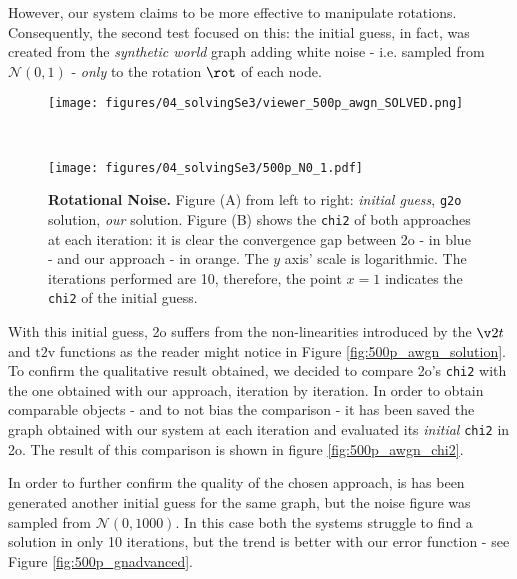 However, our system claims to be more effective to manipulate rotations. Consequently, the second test focused on this: the initial guess, in fact, was created from the \textit{synthetic world} graph adding white noise - i.e. sampled from $\mathcal{N}(0,1)$ - \textit{only} to the rotation $\rot$ of each node.

\begin{figure}[!hbt]
    \centering    
    \begin{minipage}[t!]{0.9\textwidth}
        \centering
        \texttt{[image: figures/04\_solvingSe3/viewer\_500p\_awgn\_SOLVED.png]}
        \subcaption{} 
        \label{fig:500p_awgn_solution}
    \end{minipage}\\
    \begin{minipage}[t!]{0.9\textwidth}
        \centering
        \texttt{[image: figures/04\_solvingSe3/500p\_N0\_1.pdf]}
        \subcaption{}
        \label{fig:500p_awgn_chi2}
    \end{minipage}%
    \caption{\textbf{Rotational Noise.} Figure (A) from left to right: \textit{initial guess}, \texttt{g2o} solution, \textit{our} solution. Figure (B) shows the \texttt{chi2} of both approaches at each iteration: it is clear the convergence gap between \g2o - in blue - and our approach - in orange. The $y$ axis' scale is logarithmic. The iterations performed are 10, therefore, the point $x = 1$ indicates the \texttt{chi2} of the initial guess.}
    \label{fig:500p_awgn}
\end{figure}

With this initial guess, \g2o suffers from the non-linearities introduced by the $\v2t$ and $\text{t2v}$ functions as the reader might notice in Figure \ref{fig:500p_awgn_solution}. To confirm the qualitative result obtained, we decided to compare \g2o's \texttt{chi2} with the one obtained with our approach, iteration by iteration. In order to obtain comparable objects - and to not bias the comparison - it has been saved the graph obtained with our system at each iteration and evaluated its \textit{initial} \texttt{chi2} in \g2o. The result of this comparison is shown in figure \ref{fig:500p_awgn_chi2}.

In order to further confirm the quality of the chosen approach, is has been generated another initial guess for the same graph, but the noise figure was sampled from $\mathcal{N}(0, 1000)$. In this case both the systems struggle to find a solution in only 10 iterations, but the trend is better with our error function - see Figure \ref{fig:500p_gnadvanced}.

